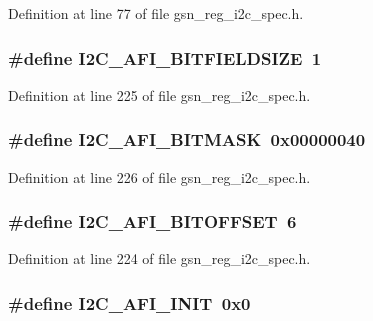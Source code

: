 Definition at line 77 of file gsn\_\-reg\_\-i2c\_\-spec.h.

\hypertarget{a00558_a316c7cd44acf0ab5bd69b1252fb6b531}{
\subsubsection[{I2C\_\-AFI\_\-BITFIELDSIZE}]{\setlength{\rightskip}{0pt plus 5cm}\#define I2C\_\-AFI\_\-BITFIELDSIZE~1}}
\label{a00558_a316c7cd44acf0ab5bd69b1252fb6b531}


Definition at line 225 of file gsn\_\-reg\_\-i2c\_\-spec.h.

\hypertarget{a00558_a613693e037f3e581be188774a57de38d}{
\subsubsection[{I2C\_\-AFI\_\-BITMASK}]{\setlength{\rightskip}{0pt plus 5cm}\#define I2C\_\-AFI\_\-BITMASK~0x00000040}}
\label{a00558_a613693e037f3e581be188774a57de38d}


Definition at line 226 of file gsn\_\-reg\_\-i2c\_\-spec.h.

\hypertarget{a00558_a0ab883af6618163f1b0298c83cef5d44}{
\subsubsection[{I2C\_\-AFI\_\-BITOFFSET}]{\setlength{\rightskip}{0pt plus 5cm}\#define I2C\_\-AFI\_\-BITOFFSET~6}}
\label{a00558_a0ab883af6618163f1b0298c83cef5d44}


Definition at line 224 of file gsn\_\-reg\_\-i2c\_\-spec.h.

\hypertarget{a00558_a474eaae345f458884e975ae797f1c9da}{
\subsubsection[{I2C\_\-AFI\_\-INIT}]{\setlength{\rightskip}{0pt plus 5cm}\#define I2C\_\-AFI\_\-INIT~0x0}}
\label{a00558_a474eaae345f458884e975ae797f1c9da}



